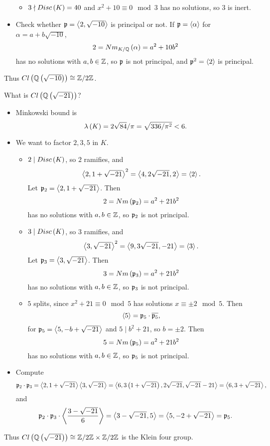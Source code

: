 \begin{example*}
\begin{itemize}
\begin{itemize}
\item $ 3 \nmid Disc\left( K \right) = 40 $ and $ x^2 + 10 \equiv 0 \mod 3 $ has no solutions, so $ 3 $ is inert.
\end{itemize}
\item Check whether $ \mathfrak{p} = \left\langle 2, \sqrt{-10} \right\rangle $ is principal or not. If $ \mathfrak{p} = \left\langle \alpha \right\rangle $ for $ \alpha = a + b\sqrt{-10} $,
$$ 2 = Nm_{K / \mathbb{Q}}\left( \alpha \right) = a^2 + 10b^2 $$
has no solutions with $ a, b \in \mathbb{Z} $, so $ \mathfrak{p} $ is not principal, and $ \mathfrak{p}^2 = \left\langle 2 \right\rangle $ is principal.
\end{itemize}
Thus $ Cl\left( \mathbb{Q}\left( \sqrt{-10} \right) \right) \cong \mathbb{Z} / 2\mathbb{Z} $.
\end{example*}

\pagebreak

\begin{example*}
What is $ Cl\left( \mathbb{Q}\left( \sqrt{-21} \right) \right) $?
\begin{itemize}
\item Minkowski bound is
$$ \lambda\left( K \right) = 2\sqrt{84} / \pi = \sqrt{336 / \pi^2} < 6. $$
\item We want to factor $ 2, 3, 5 $ in $ K $.
\begin{itemize}
\item $ 2 \mid Disc\left( K \right) $, so $ 2 $ ramifies, and
$$ \left\langle 2, 1 + \sqrt{-21} \right\rangle^2 = \left\langle 4, 2\sqrt{-21}, 2 \right\rangle = \left\langle 2 \right\rangle. $$
Let $ \mathfrak{p}_2 = \left\langle 2, 1 + \sqrt{-21} \right\rangle $. Then
$$ 2 = Nm\left( \mathfrak{p}_2 \right) = a^2 + 21b^2 $$
has no solutions with $ a, b \in \mathbb{Z} $, so $ \mathfrak{p}_2 $ is not principal.
\item $ 3 \mid Disc\left( K \right) $, so $ 3 $ ramifies, and
$$ \left\langle 3, \sqrt{-21} \right\rangle^2 = \left\langle 9, 3\sqrt{-21}, -21 \right\rangle = \left\langle 3 \right\rangle. $$
Let $ \mathfrak{p}_3 = \left\langle 3, \sqrt{-21} \right\rangle $. Then
$$ 3 = Nm\left( \mathfrak{p}_3 \right) = a^2 + 21b^2 $$
has no solutions with $ a, b \in \mathbb{Z} $, so $ \mathfrak{p}_3 $ is not principal.
\item $ 5 $ splits, since $ x^2 + 21 \equiv 0 \mod 5 $ has solutions $ x \equiv \pm 2 \mod 5 $. Then
$$ \left\langle 5 \right\rangle = \mathfrak{p}_5 \cdot \overline{\mathfrak{p}_5}, $$
for $ \mathfrak{p}_5 = \left\langle 5, -b + \sqrt{-21} \right\rangle $ and $ 5 \mid b^2 + 21 $, so $ b = \pm 2 $. Then
$$ 5 = Nm\left( \mathfrak{p}_5 \right) = a^2 + 21b^2 $$
has no solutions with $ a, b \in \mathbb{Z} $, so $ \mathfrak{p}_5 $ is not principal.
\end{itemize}
\item Compute
$$ \mathfrak{p}_2 \cdot \mathfrak{p}_3 = \left\langle 2, 1 + \sqrt{-21} \right\rangle\left\langle 3, \sqrt{-21} \right\rangle = \left\langle 6, 3\left( 1 + \sqrt{-21} \right), 2\sqrt{-21}, \sqrt{-21} - 21 \right\rangle = \left\langle 6, 3 + \sqrt{-21} \right\rangle, $$
and
$$ \mathfrak{p}_2 \cdot \mathfrak{p}_3 \cdot \left\langle \dfrac{3 - \sqrt{-21}}{6} \right\rangle = \left\langle 3 - \sqrt{-21}, 5 \right\rangle = \left\langle 5, -2 + \sqrt{-21} \right\rangle = \mathfrak{p}_5. $$
\end{itemize}
Thus $ Cl\left( \mathbb{Q}\left( \sqrt{-21} \right) \right) \cong \mathbb{Z} / 2\mathbb{Z} \times \mathbb{Z} / 2\mathbb{Z} $ is the Klein four group.
\end{example*}

